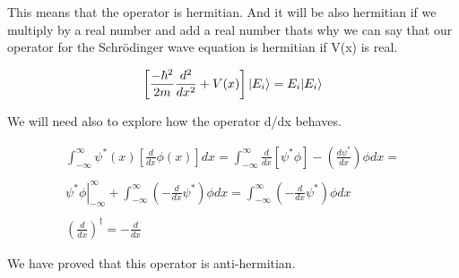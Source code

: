 This means that the operator is hermitian. And it will be also hermitian if we multiply by a real number and add a real number thats why we can say that our operator for the Schrödinger wave equation is hermitian if V(x) is real.

\begin{equation}
  \left[\frac{-\hbar^2}{2m}\frac{d^2}{dx^2}+V(x)\right]\lvert E_i\rangle = E_i \lvert E_i\rangle
\end{equation}

We will need also to explore how the operator d/dx behaves.

\begin{equation}
  \begin{array}{c}
    \int_{-\infty}^{\infty}\psi^*(x)\left[\frac{d}{dx}\phi(x)\right] dx = \int_{-\infty}^{\infty} \frac{d}{dx}\left[\psi^* \phi\right]-\left(\frac{d\psi^*}{dx}\right) \phi dx =
    \\

    \\
    \left.\psi^*\phi\right|_{-\infty}^{\infty} + \int_{-\infty}^{\infty} \left(-\frac{d}{dx}\psi^*\right)\phi dx = \int_{-\infty}^{\infty} \left(-\frac{d}{dx}\psi^*\right)\phi dx
    \\

    \\
    \left(\frac{d}{dx}\right)^{\dagger} = -\frac{d}{dx}
  \end{array}
\end{equation}

We have proved that this operator is anti-hermitian.




